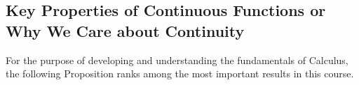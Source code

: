 














\subsection{Key Properties of Continuous Functions or Why We Care about Continuity}

For the purpose of developing and understanding the fundamentals of Calculus, the following Proposition ranks among the most important results in this course. 

